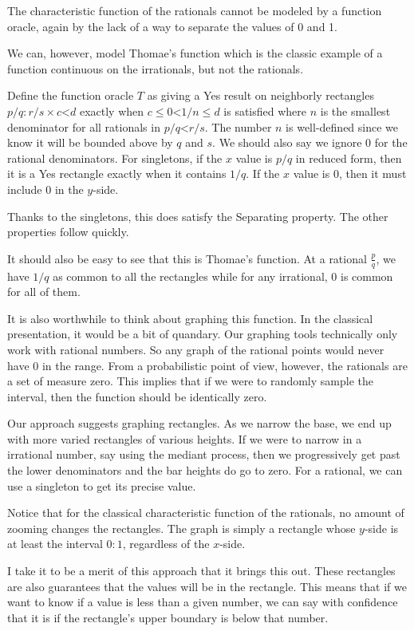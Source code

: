 \documentclass[12pt]{article}
\theoremstyle{remark}
\newcommand{\lt}{\mathord{<}}
\begin{document}
The characteristic function of the rationals cannot be modeled by a function oracle, again by the lack of a way to separate the values of 0 and 1. 

We can, however, model Thomae's function which is the classic example of a function continuous on the irrationals, but not the rationals. 

Define the function oracle $T$ as giving a Yes result on neighborly rectangles $p/q : r/s \times c\lt d$ exactly when $c \leq 0 \lt 1/n \leq d$ is satisfied where $n$ is the smallest denominator for all rationals in $p/q \lt r/s$. The number $n$ is well-defined since we know it will be bounded above by $q$ and $s$.  We should also say we ignore $0$ for the rational denominators. For singletons, if the $x$ value is $p/q$ in reduced form, then it is a Yes rectangle exactly when it contains $1/q$. If the $x$ value is $0$, then it must include $0$ in the $y$-side.

Thanks to the singletons, this does satisfy the Separating property. The other properties follow quickly. 

It should also be easy to see that this is Thomae's function. At a rational $\frac{p}{q}$, we have $1/q$ as common to all the rectangles while for any irrational, $0$ is common for all of them. 

It is also worthwhile to think about graphing this function. In the classical presentation, it would be a bit of quandary. Our graphing tools technically only work with rational numbers. So any graph of the rational points would never have 0 in the range. From a probabilistic point of view, however, the rationals are a set of measure zero. This implies that if we were to randomly sample the interval, then the function should be identically zero. 

Our approach suggests graphing rectangles. As we narrow the base, we end up with more varied rectangles of various heights. If we were to narrow in a irrational number, say using the mediant process, then we progressively get past the lower denominators and the bar heights do go to zero. For a rational, we can use a singleton to get its precise value. 

Notice that for the classical characteristic function of the rationals, no amount of zooming changes the rectangles. The graph is simply a rectangle whose $y$-side is at least the interval $0:1$, regardless of the $x$-side. 

I take it to be a merit of this approach that it brings this out. These rectangles are also guarantees that the values will be in the rectangle. This means that if we want to know if a value is less than a given number, we can say with confidence that it is if the rectangle's upper boundary is below that number. 
\end{document}
